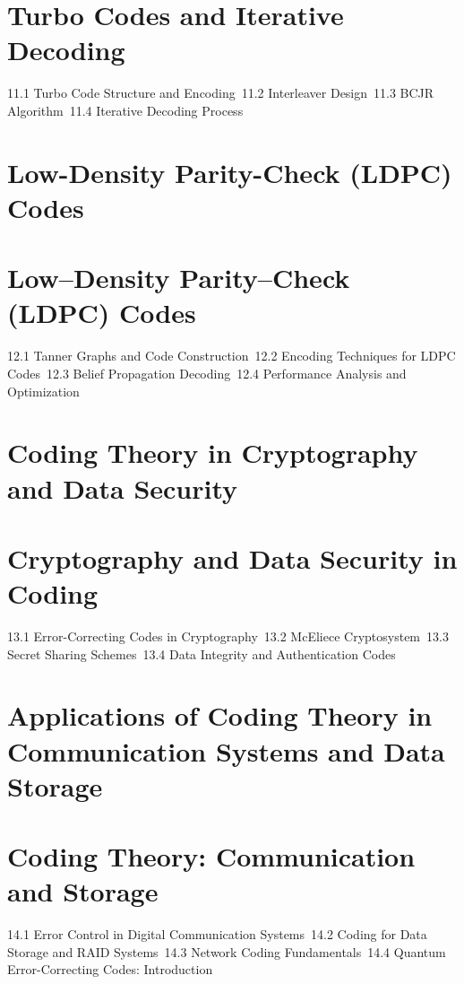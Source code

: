 \section{Turbo Codes and Iterative Decoding}
11.1 Turbo Code Structure and Encoding\
11.2 Interleaver Design\
11.3 BCJR Algorithm\
11.4 Iterative Decoding Process\
\section{Low-Density Parity-Check (LDPC) Codes}
\section{Low–Density Parity–Check (LDPC) Codes}
12.1 Tanner Graphs and Code Construction\
12.2 Encoding Techniques for LDPC Codes\
12.3 Belief Propagation Decoding\
12.4 Performance Analysis and Optimization\
\section{Coding Theory in Cryptography and Data Security}
\section{Cryptography and Data Security in Coding}
13.1 Error-Correcting Codes in Cryptography\
13.2 McEliece Cryptosystem\
13.3 Secret Sharing Schemes\
13.4 Data Integrity and Authentication Codes\
\section{Applications of Coding Theory in Communication Systems and Data Storage}
\section{Coding Theory: Communication and Storage}
14.1 Error Control in Digital Communication Systems\
14.2 Coding for Data Storage and RAID Systems\
14.3 Network Coding Fundamentals\
14.4 Quantum Error-Correcting Codes: Introduction\

